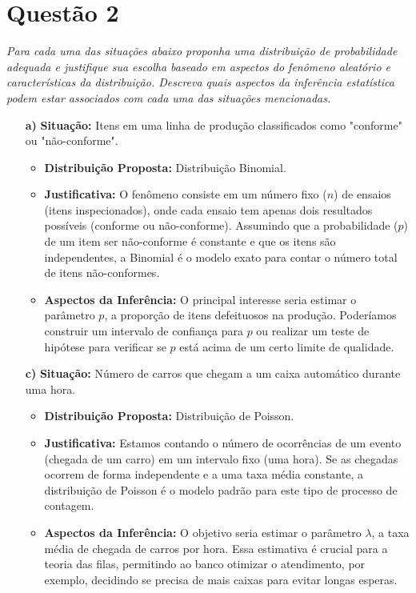 \documentclass[12pt, a4paper]{article}
\begin{document}
\newpage %

\section*{Questão 2}
\textit{Para cada uma das situações abaixo proponha uma distribuição de probabilidade adequada e justifique sua escolha baseado em aspectos do fenômeno aleatório e características da distribuição. Descreva quais aspectos da inferência estatística podem estar associados com cada uma das situações mencionadas.}

\begin{enumerate}
    \item[\textbf{a)}] \textbf{Situação:} Itens em uma linha de produção classificados como "conforme" ou "não-conforme".
        \begin{itemize}
            \item \textbf{Distribuição Proposta:} Distribuição Binomial.
            \item \textbf{Justificativa:} O fenômeno consiste em um número fixo ($n$) de ensaios (itens inspecionados), onde cada ensaio tem apenas dois resultados possíveis (conforme ou não-conforme). Assumindo que a probabilidade ($p$) de um item ser não-conforme é constante e que os itens são independentes, a Binomial é o modelo exato para contar o número total de itens não-conformes.
            \item \textbf{Aspectos da Inferência:} O principal interesse seria estimar o parâmetro $p$, a proporção de itens defeituosos na produção. Poderíamos construir um intervalo de confiança para $p$ ou realizar um teste de hipótese para verificar se $p$ está acima de um certo limite de qualidade.
        \end{itemize}

    \item[\textbf{c)}] \textbf{Situação:} Número de carros que chegam a um caixa automático durante uma hora.
        \begin{itemize}
            \item \textbf{Distribuição Proposta:} Distribuição de Poisson.
            \item \textbf{Justificativa:} Estamos contando o número de ocorrências de um evento (chegada de um carro) em um intervalo fixo (uma hora). Se as chegadas ocorrem de forma independente e a uma taxa média constante, a distribuição de Poisson é o modelo padrão para este tipo de processo de contagem.
            \item \textbf{Aspectos da Inferência:} O objetivo seria estimar o parâmetro $\lambda$, a taxa média de chegada de carros por hora. Essa estimativa é crucial para a teoria das filas, permitindo ao banco otimizar o atendimento, por exemplo, decidindo se precisa de mais caixas para evitar longas esperas.
        \end{itemize}


\end{enumerate}
\end{document}
